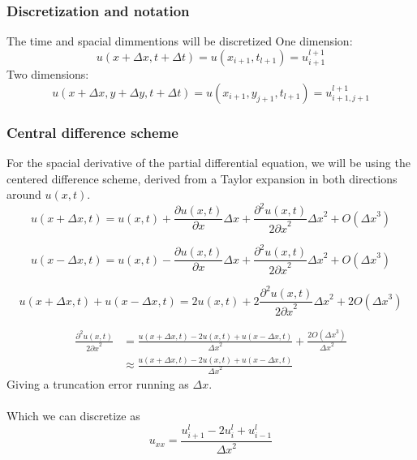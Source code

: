 \documentclass[10pt,a4paper]{article}
\newcommand{\dt}{{\Delta t}}
\newcommand{\dx}{{\Delta x}}
\newcommand{\dy}{{\Delta y}}
\newcommand{\px}{{\partial x}}
\newcommand{\pu}{{\partial u}}
\newcommand{\ppu}{{\partial^2 u}}
\begin{document}
\subsubsection{Discretization and notation}\label{sec:disc}
The time and spacial dimmentions will be discretized 
One dimension:
\begin{equation}
u(x+\dx, t+\dt) = u(x_{i+1},t_{l+1}) = u_{i+1}^{l+1}
\end{equation}
Two dimensions:
\begin{equation}
u(x+\dx, y+\dy, t+\dt) = u(x_{i+1}, y_{j+1}, t_{l+1}) = u_{i+1,j+1}^{l+1}
\end{equation}


\subsubsection{Central difference scheme}
For the spacial derivative of the partial differential equation, we will be using the centered difference scheme, derived from a Taylor expansion in both directions around $u(x,t)$.
\begin{equation}
u(x+\Delta x, t) = u(x,t) + \frac{\pu(x,t)}{\px}\dx + \frac{\ppu(x,t)}{2\px^2}\dx^2 + O(\dx^3)
\end{equation}

\begin{equation}
u(x-\Delta x, t) = u(x,t) - \frac{\pu(x,t)}{\px}\dx + \frac{\ppu(x,t)}{2\px^2}\dx^2 + O(\dx^3)
\end{equation}

\begin{equation}
u(x+\Delta x, t) + u(x-\Delta x, t) = 2u(x,t) + 2\frac{\ppu(x,t)}{2\px^2}\dx^2 + 2O(\dx^3)
\end{equation}

\begin{equation}\begin{split}
\frac{\ppu(x,t)}{2\px^2} &= \frac{u(x+\Delta x, t) - 2u(x,t) + u(x-\Delta x, t)}{\dx^2} + \frac{2O(\dx^3)}{\dx^2}\\
&\approx \frac{u(x+\Delta x, t) - 2u(x,t) + u(x-\Delta x, t)}{\dx^2}
\end{split}\end{equation}
Giving a truncation error running as $\dx$.\\\\
Which we can discretize as
\begin{equation}
u_{xx} = \frac{u_{i+1}^l - 2u_i^l+u_{i-1}^l}{\dx^2}
\end{equation}
\end{document}
